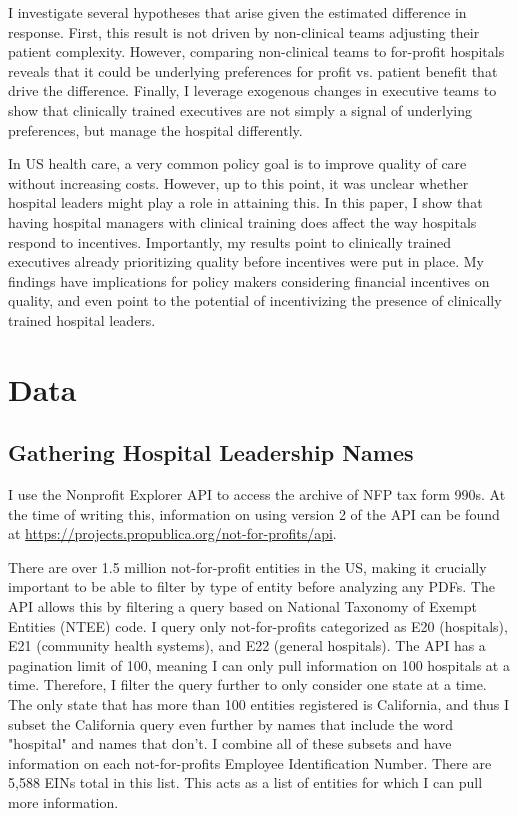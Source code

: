 \documentclass[12pt]{article}
\begin{document}
    I investigate several hypotheses that arise given the estimated difference in response. First, this result is not driven by non-clinical teams adjusting their patient complexity. However, comparing non-clinical teams to for-profit hospitals reveals that it could be underlying preferences for profit vs. patient benefit that drive the difference. Finally, I leverage exogenous changes in executive teams to show that clinically trained executives are not simply a signal of underlying preferences, but manage the hospital differently. 

    In US health care, a very common policy goal is to improve quality of care without increasing costs. However, up to this point, it was unclear whether hospital leaders might play a role in attaining this. In this paper, I show that having hospital managers with clinical training does affect the way hospitals respond to incentives. Importantly, my results point to clinically trained executives already prioritizing quality before incentives were put in place. My findings have implications for policy makers considering financial incentives on quality, and even point to the potential of incentivizing the presence of clinically trained hospital leaders. 

    

	
	\newpage

    \printbibliography

\appendix

 \section{Data}\label{appendixdata}

\subsection{Gathering Hospital Leadership Names}

I use the Nonprofit Explorer API to access the archive of NFP tax form 990s. At the time of writing this, information on using version 2 of the API can be found at \hyperlink{https://projects.propublica.org/not-for-profits/api}{https://projects.propublica.org/not-for-profits/api}. 
    
There are over 1.5 million not-for-profit entities in the US, making it crucially important to be able to filter by type of entity before analyzing any PDFs. The API allows this by filtering a query based on National Taxonomy of Exempt Entities (NTEE) code. I query only not-for-profits categorized as E20 (hospitals), E21 (community health systems), and E22 (general hospitals). The API has a pagination limit of 100, meaning I can only pull information on 100 hospitals at a time. Therefore, I filter the query further to only consider one state at a time. The only state that has more than 100 entities registered is California, and thus I subset the California query even further by names that include the word "hospital" and names that don't. I combine all of these subsets and have information on each not-for-profits Employee Identification Number. There are 5,588 EINs total in this list. This acts as a list of entities for which I can pull more information. 
\end{document}
